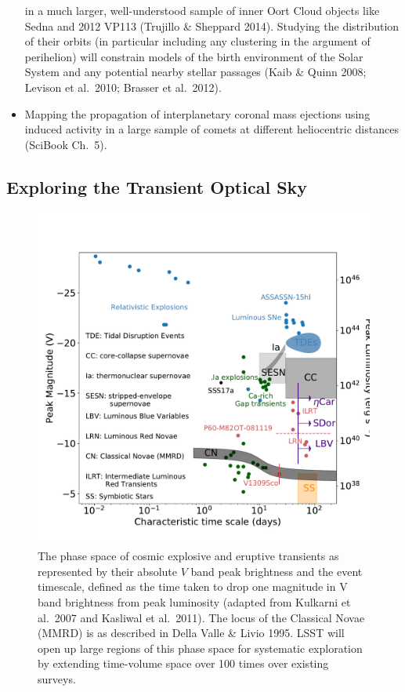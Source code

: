 \begin{itemize}
in a much larger, well-understood sample of inner Oort Cloud objects like Sedna and 2012 VP113
 (Trujillo \& Sheppard 2014).  Studying the distribution of their orbits (in particular including any 
clustering in the argument of perihelion) will constrain models of the birth environment of the 
Solar System and any potential nearby stellar passages (Kaib \& Quinn 2008; Levison et al.~2010;
Brasser et al.~2012). 
\item Mapping the propagation of interplanetary coronal mass ejections using induced 
 activity in a large sample of comets at different heliocentric distances
(SciBook Ch.~5).
\end{itemize}



\subsection{ Exploring the Transient Optical Sky }




\begin{figure}
\hskip -0.1in
\vskip -0.1in
\includegraphics[width=1.0\hsize,clip]{taumv_updated.pdf}
\caption{The phase space of cosmic explosive and eruptive transients
  as represented by their absolute $V$ band peak brightness and the
  event timescale, defined as the time taken to drop one magnitude in
  V band brightness from peak luminosity (adapted from Kulkarni et
  al.~2007 and Kasliwal et al.~2011).  The locus of the Classical
  Novae (MMRD) is as described in Della Valle \& Livio 1995.  LSST
  will open up large regions of this phase space for systematic
  exploration by extending time-volume space over 100 times over
  existing surveys.}
\label{Fig:shri}
\end{figure}

